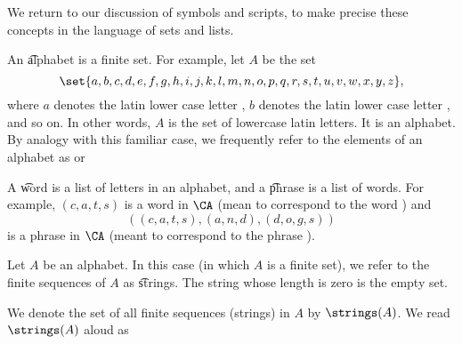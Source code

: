 
We return to our discussion of symbols and scripts, to make precise these concepts in the language of sets and lists.


An \t{alphabet} is a finite set.
For example, let $A$ be the set
  \[
\set{a, b, c, d, e, f,g,h,i,j,k,l,m,n,o,p,q,r,s,t,u,v,w, x, y,z},
  \]
where $a$ denotes the latin lower case letter , $b$ denotes the latin lower case letter , and so on.
In other words, $A$ is the set of lowercase latin letters.
It is an alphabet.
By analogy with this familiar case, we frequently refer to the elements of an alphabet as  or 

A \t{word} is a list of letters in an alphabet, and a \t{phrase} is a list of words.
For example, $(c,a,t,s)$ is a word in $\CA$ (mean to correspond to the word ) and
  \[
((c,a,t,s), (a,n,d), (d,o,g,s))
  \]
is a phrase in $\CA$ (meant to correspond to the phrase ).

Let $A$ be an alphabet.
In this case (in which $A$ is a finite set), we refer to the finite sequences of $A$ as \t{strings}.
The string whose length is zero is the empty set.

We denote the set of all finite sequences (strings) in $A$ by $\strings(A)$.
We read $\strings(A)$ aloud as 

